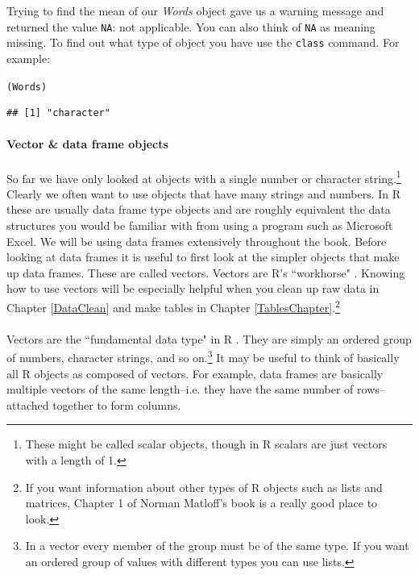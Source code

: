 \documentclass[krantz1]{krantz}
\begin{document}
\noindent Trying to find the mean of our {\emph{Words}} object gave us a warning message and returned the value {\tt{NA}}: not applicable. You can also think of {\tt{NA}} as meaning missing. To find out what type of object you have use the {\tt{class}} command. For example:

\begin{knitrout}
\color{fgcolor}\begin{kframe}
\begin{alltt}
(Words)
\end{alltt}
\begin{verbatim}
## [1] "character"
\end{verbatim}
\end{kframe}
\end{knitrout}


\paragraph{Vector \& data frame objects}

So far we have only looked at objects with a single number or character string.\footnote{These might be called scalar objects, though in R scalars are just vectors with a length of 1.} Clearly we often want to use objects that have many strings and numbers. In R these are usually data frame type objects and are roughly equivalent the data structures you would be familiar with from using a program such as Microsoft Excel. We will be using data frames extensively throughout the book. Before looking at data frames it is useful to first look at the simpler objects that make up data frames. These are called vectors. Vectors are R's ``workhorse" \cite[]{Matloff2011}. Knowing how to use vectors will be especially helpful when you clean up raw data in Chapter \ref{DataClean} and make tables in Chapter \ref{TablesChapter}.\footnote{If you want information about other types of R objects such as lists and matrices, Chapter 1 of Norman Matloff's \citeyearpar{Matloff2011} book is a really good place to look.} \\[0.25cm]

 \\[0.25cm] Vectors are the ``fundamental data type" in R \cite[]{Matloff2011}. They are simply an ordered group of numbers, character strings, and so on.\footnote{In a vector every member of the group must be of the same type. If you want an ordered group of values with different types you can use lists.} It may be useful to think of basically all R objects as composed of vectors. For example, data frames are basically multiple vectors of the same length--i.e. they have the same number of rows--attached together to form columns. 
\end{document}
